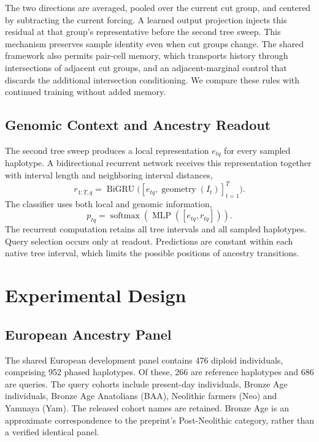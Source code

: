 \documentclass[letterpaper]{article}
\begin{document}
The two directions are averaged, pooled over the current cut group, and centered by subtracting the current forcing. A learned output projection injects this residual at that group's representative before the second tree sweep. This mechanism preserves sample identity even when cut groups change. The shared framework also permits pair-cell memory, which transports history through intersections of adjacent cut groups, and an adjacent-marginal control that discards the additional intersection conditioning. We compare these rules with continued training without added memory.

\subsection{Genomic Context and Ancestry Readout}
The second tree sweep produces a local representation $e_{tq}$ for every sampled haplotype. A bidirectional recurrent network receives this representation together with interval length and neighboring interval distances,
\begin{equation}
r_{1:T,q}=\operatorname{BiGRU}
 \bigl([e_{tq},\operatorname{geometry}(I_t)]_{t=1}^T\bigr).
\end{equation}
The classifier uses both local and genomic information,
\begin{equation}
p_{tq}=\operatorname{softmax}
 \left(\operatorname{MLP}([e_{tq},r_{tq}])\right).
\end{equation}
The recurrent computation retains all tree intervals and all sampled haplotypes. Query selection occurs only at readout. Predictions are constant within each native tree interval, which limits the possible positions of ancestry transitions.

\section{Experimental Design}
\subsection{European Ancestry Panel}
The shared European development panel contains 476 diploid individuals, comprising 952 phased haplotypes. Of these, 266 are reference haplotypes and 686 are queries. The query cohorts include present-day individuals, Bronze Age individuals, Bronze Age Anatolians (BAA), Neolithic farmers (Neo) and Yamnaya (Yam). The released cohort names are retained. Bronze Age is an approximate correspondence to the preprint's Post-Neolithic category, rather than a verified identical panel.
\end{document}
